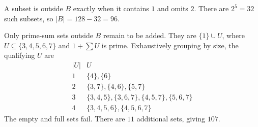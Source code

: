 A subset is outside $B$ exactly when it contains $1$ and omits $2$. There are $2^5=32$ such subsets, so $|B|=128-32=96$.

Only prime-sum sets outside $B$ remain to be added. They are $\{1\}\cup U$, where $U\subseteq\{3,4,5,6,7\}$ and $1+\sum U$ is prime. Exhaustively grouping by size, the qualifying $U$ are
\[
\begin{array}{c|l}
|U|&U\\\hline
1&\{4\},\{6\}\\
2&\{3,7\},\{4,6\},\{5,7\}\\
3&\{3,4,5\},\{3,6,7\},\{4,5,7\},\{5,6,7\}\\
4&\{3,4,5,6\},\{4,5,6,7\}
\end{array}
\]
The empty and full sets fail. There are $11$ additional sets, giving $\boxed{107}$.
